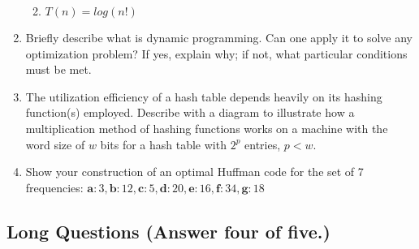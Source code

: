 \begin{enumerate}
\begin{enumerate}[label=\alph*.]
		\vskip 6pt
		
		\item $T(n) = log(n!)$
	\end{enumerate}
	
	
	\item Briefly describe what is dynamic programming.   Can one apply it to solve any optimization problem?  If yes, explain why; if not, what particular conditions must be met.
	
	
	\item The utilization efficiency of a hash table depends heavily on its hashing function(s) employed.  Describe with a diagram to illustrate how a multiplication method of hashing functions works on a machine with the word size of $w$ bits for a hash table with $2^p$ entries, $p<w$.  
	
	
	\item Show your construction of an optimal Huffman code for the set of 7 frequencies:  $\mathbf{a}: 3, \mathbf{b}: 12, \mathbf{c}: 5, \mathbf{d}: 20, \mathbf{e}:16, \mathbf{f}: 34, \mathbf{g}:18$
	
\end{enumerate}

\subsection{Long Questions (Answer four of five.)}

